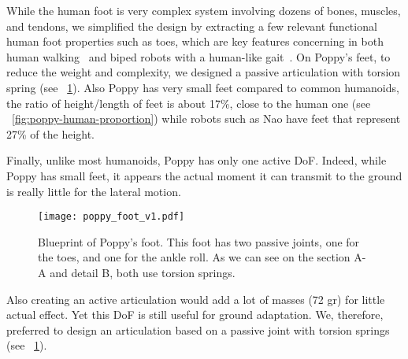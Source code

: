 While the human foot is very complex system involving dozens of bones, muscles, and tendons, we simplified the design by extracting a few relevant functional human foot properties such as toes, which are key features concerning in both human walking~\cite{Hughes1990} and biped robots with a human-like gait~\cite{Sellaouti2006}. On Poppy's feet, to reduce the weight and complexity, we designed a passive articulation with torsion spring (see \figurename~\ref{fig:poppy-foot-v1-design}).
Also Poppy has very small feet compared to common humanoids, the ratio of height/length of feet is about 17\%,  close to the human one (see \figurename~\ref{fig:poppy-human-proportion}) while robots such as Nao have feet that represent 27\% of the height.



Finally, unlike most humanoids, Poppy has only one active DoF. Indeed, while Poppy has small feet, it appears the actual moment it can transmit to the ground is really little for the lateral motion.


\begin{figure}[p]
    \centering
        \texttt{[image: poppy\_foot\_v1.pdf]}
    \caption{Blueprint of Poppy's foot. This foot has two passive joints, one for the toes, and one for the ankle roll. As we can see on the section A-A and detail B, both use torsion springs.}
    \label{fig:poppy-foot-v1-design}
\end{figure}

Also creating an active articulation would add a lot of masses (72 gr) for little actual effect. Yet this DoF is still useful for ground adaptation.
We, therefore, preferred to design an articulation based on a passive joint with torsion springs (see \figurename~\ref{fig:poppy-foot-v1-design}).

